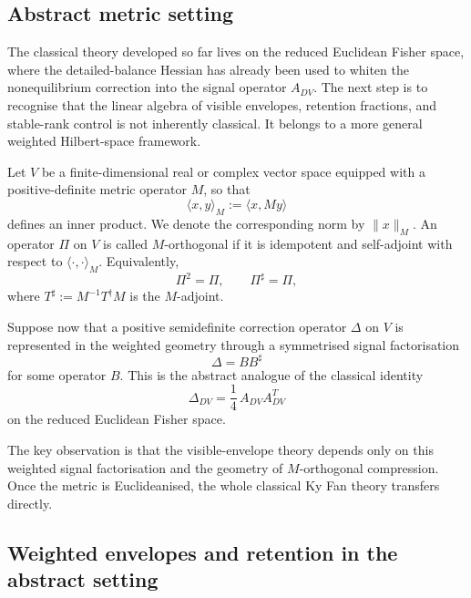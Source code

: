 \documentclass[11pt,a4paper]{article}
\numberwithin{equation}{section}
\theoremstyle{thmcompact}
\theoremstyle{remark}
\begin{document}
\subsection{Abstract metric setting}

The classical theory developed so far lives on the reduced Euclidean Fisher space, where the detailed-balance Hessian has already been used to whiten the nonequilibrium correction into the signal operator \(A_{DV}\). The next step is to recognise that the linear algebra of visible envelopes, retention fractions, and stable-rank control is not inherently classical. It belongs to a more general weighted Hilbert-space framework.

Let \(V\) be a finite-dimensional real or complex vector space equipped with a positive-definite metric operator \(M\), so that
\begin{equation}
\langle x,y\rangle_M := \langle x,My\rangle
\end{equation}
defines an inner product. We denote the corresponding norm by \(\|x\|_M\). An operator \(\Pi\) on \(V\) is called \(M\)-orthogonal if it is idempotent and self-adjoint with respect to \(\langle\cdot,\cdot\rangle_M\). Equivalently,
\begin{equation}
\Pi^2=\Pi,
\qquad
\Pi^{\sharp}=\Pi,
\end{equation}
where \(T^{\sharp}:=M^{-1}T^\dagger M\) is the \(M\)-adjoint.

Suppose now that a positive semidefinite correction operator \(\Delta\) on \(V\) is represented in the weighted geometry through a symmetrised signal factorisation
\begin{equation}
\Delta = BB^{\sharp}
\end{equation}
for some operator \(B\). This is the abstract analogue of the classical identity
\begin{equation}
\Delta_{DV}=\frac14\,A_{DV}A_{DV}^{T}
\end{equation}
on the reduced Euclidean Fisher space.

The key observation is that the visible-envelope theory depends only on this weighted signal factorisation and the geometry of \(M\)-orthogonal compression. Once the metric is Euclideanised, the whole classical Ky Fan theory transfers directly.

\subsection{Weighted envelopes and retention in the abstract setting}
\end{document}
